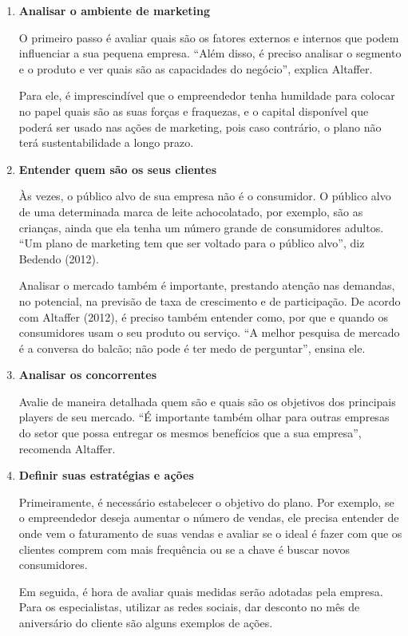 \documentclass[
	12pt,				%
	openright,			%
	oneside,			%
	a4paper,			%
	english,			%
	french,				%
	spanish,			%
	brazil				%
	]{abntex2}
\begin{document}
	\begin{enumerate}
		\item \textbf{Analisar o ambiente de marketing}
		
		O primeiro passo é avaliar quais são os fatores externos e internos que podem influenciar a sua pequena empresa. “Além disso, é preciso analisar o segmento e o produto e ver quais são as capacidades do negócio”, explica Altaffer.
			
		Para ele, é imprescindível que o empreendedor tenha humildade para colocar no papel quais são as suas forças e fraquezas, e o capital disponível que poderá ser usado nas ações de marketing, pois caso contrário, o plano não terá sustentabilidade a longo prazo.
		\pagebreak
		\item \textbf{Entender quem são os seus clientes}
		
		Às vezes, o público alvo de sua empresa não é o consumidor. O público alvo de uma determinada marca de leite achocolatado, por exemplo, são as crianças, ainda que ela tenha um número grande de consumidores adultos. “Um plano de marketing tem que ser voltado para o público alvo”, diz Bedendo (2012).
		
		Analisar o mercado também é importante, prestando atenção nas demandas, no potencial, na previsão de taxa de crescimento e de participação. De acordo com Altaffer (2012), é preciso também entender como, por que e quando os consumidores usam o seu produto ou serviço. “A melhor pesquisa de mercado é a conversa do balcão; não pode é ter medo de perguntar”, ensina ele.
		
		\item \textbf{Analisar os concorrentes}
		
		Avalie de maneira detalhada quem são e quais são os objetivos dos principais players de seu mercado. “É importante também olhar para outras empresas do setor que possa entregar os mesmos benefícios que a sua empresa”, recomenda Altaffer.
		
		\item \textbf{Definir suas estratégias e ações}
		
		Primeiramente, é necessário estabelecer o objetivo do plano. Por exemplo, se o empreendedor deseja aumentar o número de vendas, ele precisa entender de onde vem o faturamento de suas vendas e avaliar se o ideal é fazer com que os clientes comprem com mais frequência ou se a chave é buscar novos consumidores.
		
		Em seguida, é hora de avaliar quais medidas serão adotadas pela empresa. Para os especialistas, utilizar as redes sociais, dar desconto no mês de aniversário do cliente são alguns exemplos de ações.
		

\end{enumerate}
\end{document}
